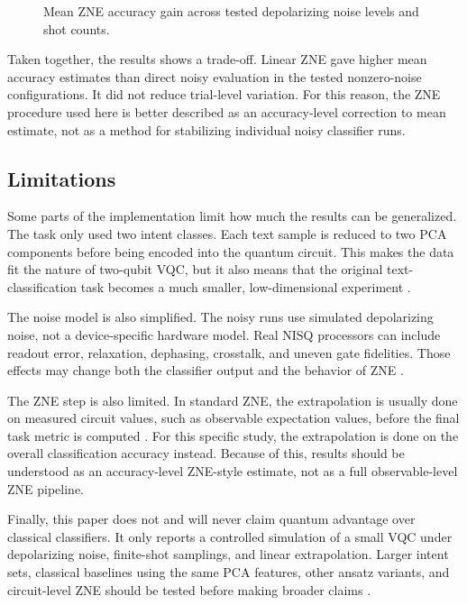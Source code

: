 \documentclass[conference]{IEEEtran}
\begin{document}
\begin{figure}[H]
\centering

\caption{Mean ZNE accuracy gain across tested depolarizing noise levels and shot counts.}
\label{fig:zne_accuracy_gain}
\end{figure}

Taken together, the results shows a trade-off. Linear ZNE gave higher mean
accuracy estimates than direct noisy evaluation in the tested nonzero-noise
configurations. It did not reduce trial-level variation. For this reason, the
ZNE procedure used here is better described as an accuracy-level correction to
mean estimate, not as a method for stabilizing individual noisy classifier
runs.

\subsection{Limitations}

Some parts of the implementation limit how much the results can be generalized.
The task only used two intent classes. Each text sample is reduced to two
PCA components before being encoded into the quantum circuit. This makes the data
fit the nature of two-qubit VQC, but it also means that the original text-classification
task becomes a much smaller, low-dimensional experiment \cite{b_higgs,
b_seilkhan2026}.

The noise model is also simplified. The noisy runs use simulated depolarizing
noise, not a device-specific hardware model. Real NISQ processors can include
readout error, relaxation, dephasing, crosstalk, and uneven gate fidelities.
Those effects may change both the classifier output and the behavior of ZNE
\cite{b_njiki2026, b_koenig2024}.

The ZNE step is also limited. In standard ZNE, the extrapolation is usually done
on measured circuit values, such as observable expectation values, before the
final task metric is computed \cite{b_koenig2024, b_mohammadipour2025}. For this
specific study, the extrapolation is done on the overall classification accuracy instead.
Because of this, results should be understood as an accuracy-level ZNE-style
estimate, not as a full observable-level ZNE pipeline.

Finally, this paper does not and will never claim quantum advantage over classical classifiers.
It only reports a controlled simulation of a small VQC under depolarizing noise,
finite-shot samplings, and linear extrapolation. Larger intent sets, classical
baselines using the same PCA features, other ansatz variants, and circuit-level
ZNE should be tested before making broader claims
\cite{b_lorenz2023, b_seilkhan2026, b_khatri2022}.
\end{document}
